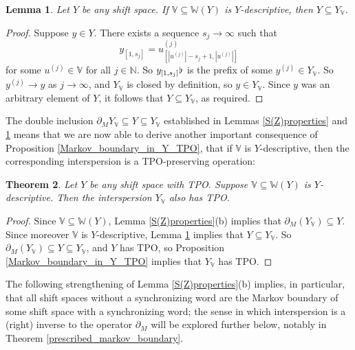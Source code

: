 \documentclass[reqno,11pt]{amsart}
\newtheorem{thm}{Theorem}[section]
\newtheorem{lem}[thm]{Lemma}
\theoremstyle{definition}
\theoremstyle{remark}
\theoremstyle{remark}
\def \N {\mathbb N}
\def\w{\mathbb{W}}
\def\v{\mathbb V}
\def\b{\kern 0.02em \flat \kern 0.02em}
\numberwithin{equation}{section}
\begin{document}
\begin{lem}\label{V_lengths_infinity_Y_contained}
Let $Y$ be any shift space. If $\v\subseteq\w(Y)$
is $Y$-descriptive,
then $Y \subseteq Y_\v$.
\end{lem}
\begin{proof}
Suppose $y\in Y$.
There exists a sequence $s_j\to\infty$
such that
$$y_{[1,s_j]}=u^{(j)}_{\left[|u^{(j)}|-s_j+1,|u^{(j)}|\right]}$$ for some $u^{(j)}\in\v$ for all $j\in\N$.
So $y_{[1,s_j]} \b$ is the prefix of some $y^{(j)}\in Y_\v$.
So $y^{(j)}\to y$ as $j\to\infty$, and $Y_\v$ is closed by definition, so $y\in Y_\v$.
Since $y$ was an arbitrary element of $Y$, it follows that $Y \subseteq Y_\v$, as required.
\end{proof}

The double inclusion $\partial_M Y_\v\subseteq Y\subseteq Y_\v$ established in Lemmas
 \ref{S(Z)properties}
and \ref{V_lengths_infinity_Y_contained}
means that
we are now able to derive 
another important consequence of Proposition \ref{Markov_boundary_in_Y_TPO},  
that if $\v$ is $Y$-descriptive, then the corresponding interspersion is a TPO-preserving operation:

\begin{thm}\label{TPO_descriptive_TPO}
Let $Y$ be any shift space with TPO. Suppose $\v \subseteq\w(Y)$ is $Y$-descriptive.
Then the interspersion $Y_\v$ also has TPO.
\end{thm}
\begin{proof}
Since $\v \subseteq\w(Y)$,
Lemma \ref{S(Z)properties}(b)
implies that
$\partial_M( Y_\v )\subseteq Y$.
Since moreover $\v$  is $Y$-descriptive,
Lemma \ref{V_lengths_infinity_Y_contained} implies that $Y\subseteq Y_\v$.
So $\partial_M( Y_\v )\subseteq Y\subseteq Y_\v$, and $Y$ has TPO, so Proposition \ref{Markov_boundary_in_Y_TPO}
implies that $Y_\v$ has TPO.
\end{proof}


The following strengthening of Lemma \ref{S(Z)properties}(b) implies, in particular, that all shift spaces without a synchronizing word are the Markov boundary
of some shift space with a synchronizing word; the sense in which interspersion is a (right) inverse to the operator
$\partial_M$ will be explored further below, notably in  Theorem \ref{prescribed_markov_boundary}.
\end{document}
